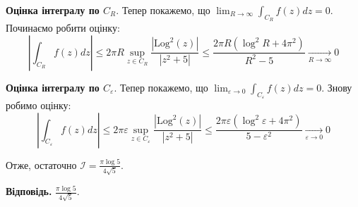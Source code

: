 \documentclass[oneside,solution]{karazin-complan-assign}
\begin{document}
\textbf{Оцінка інтегралу по $C_R$}. Тепер покажемо, що $\lim_{R \to \infty}\int_{C_R}f(z)dz = 0$. Починаємо робити оцінку:
\begin{equation}
    \left|\int_{C_R}f(z)dz\right| \leq 2\pi R \sup_{z \in C_R} \frac{|\text{Log}^2(z)|}{|z^2+5|} \leq \frac{2\pi R(\log^2 R + 4\pi^2)}{R^2 - 5} \xrightarrow[R \to \infty]{} 0
\end{equation}

\textbf{Оцінка інтегралу по $C_{\varepsilon}$}. Тепер покажемо, що $\lim_{\varepsilon \to 0}\int_{C_{\varepsilon}}f(z)dz = 0$. Знову робимо оцінку:
\begin{equation}
    \left|\int_{C_{\varepsilon}}f(z)dz\right| \leq 2\pi \varepsilon \sup_{z \in C_{\varepsilon}} \frac{|\text{Log}^2(z)|}{|z^2+5|} \leq \frac{2\pi \varepsilon(\log^2 \varepsilon + 4\pi^2)}{5 - \varepsilon^2} \xrightarrow[\varepsilon \to 0]{} 0
\end{equation}

Отже, остаточно $\boxed{\mathcal{I} = \frac{\pi \log 5}{4\sqrt{5}}}$.

\textbf{Відповідь.} $\frac{\pi \log 5}{4\sqrt{5}}$.
\end{document}
